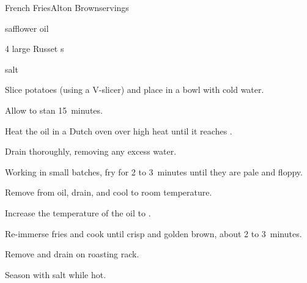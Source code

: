 \begin{recipe}{French Fries}{Alton Brown}{servings}


\begin{ingredients}
\item {} safflower oil
\item 4 large Russet s
\item salt
\end{ingredients}

\begin{directions}
\item Slice potatoes (using a V-slicer) and place in a bowl with cold water.
\item Allow to stan 15~minutes.
\item Heat the oil in a Dutch oven over high heat until it reaches .
\item Drain thoroughly, removing any excess water.
\item Working in small batches, fry for 2 to 3~minutes until they are pale and floppy.
\item Remove from oil, drain, and cool to room temperature.
\item Increase the temperature of the oil to .
\item Re-immerse fries and cook until crisp and golden brown, about 2 to 3~minutes.
\item Remove and drain on roasting rack.
\item Season with salt while hot.
\end{directions}

\end{recipe}
